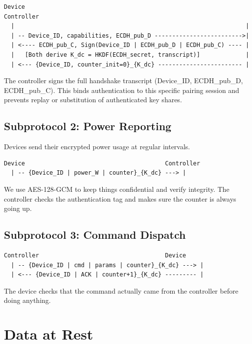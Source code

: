 \documentclass[a4paper,11pt]{article}
\begin{document}
\begin{verbatim}
Device                                                          Controller
  |                                                                  |
  | -- Device_ID, capabilities, ECDH_pub_D ------------------------->|
  | <---- ECDH_pub_C, Sign(Device_ID | ECDH_pub_D | ECDH_pub_C) ---- |
  |   [Both derive K_dc = HKDF(ECDH_secret, transcript)]             |
  | <--- {Device_ID, counter_init=0}_{K_dc} ------------------------ |
\end{verbatim}

The controller signs the full handshake transcript (Device\_ID, ECDH\_pub\_D, ECDH\_pub\_C). This binds authentication to this specific pairing session and prevents replay or substitution of authenticated key shares.

\subsection*{Subprotocol 2: Power Reporting}

Devices send their encrypted power usage at regular intervals.

\begin{verbatim}
Device                                        Controller
  | -- {Device_ID | power_W | counter}_{K_dc} ---> |
\end{verbatim}

We use AES-128-GCM to keep things confidential and verify integrity. The controller checks the authentication tag and makes sure the counter is always going up.

\subsection*{Subprotocol 3: Command Dispatch}

\begin{verbatim}
Controller                                    Device
  | -- {Device_ID | cmd | params | counter}_{K_dc} ---> |
  | <--- {Device_ID | ACK | counter+1}_{K_dc} --------- |
\end{verbatim}

The device checks that the command actually came from the controller before doing anything.

\section{Data at Rest}\label{sec:dataatrest}
\end{document}

